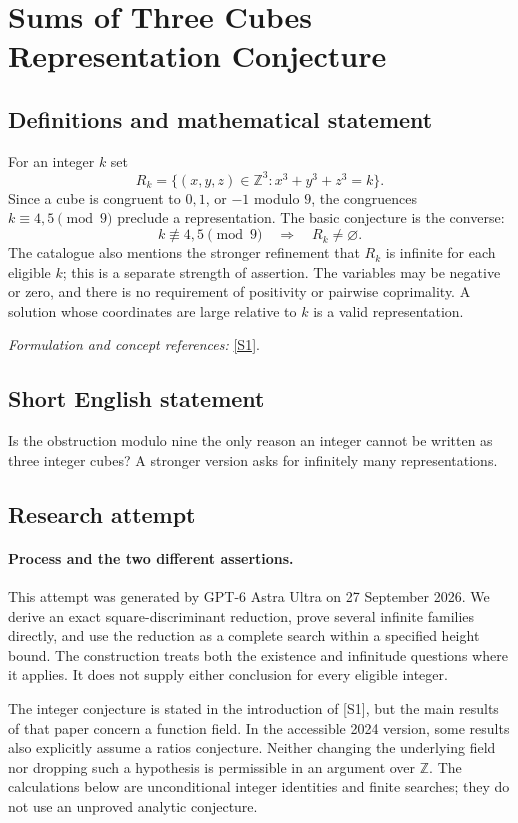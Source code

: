 \documentclass[11pt]{article}
\begin{document}
\section*{\texorpdfstring{Sums of Three Cubes Representation Conjecture}{Sums of Three Cubes Representation Conjecture}}\label{430}
\subsection{Definitions and mathematical statement}
For an integer $k$ set
\[
 R_k=\{(x,y,z)\in{\mathbb{Z}}^3:x^3+y^3+z^3=k\}.
\]
Since a cube is congruent to $0,1$, or $-1$ modulo $9$, the congruences $k\equiv4,5\pmod9$ preclude a representation. The basic conjecture is the converse:
\[
 k\not\equiv4,5\pmod9\quad\Longrightarrow\quad R_k\ne\varnothing.
\]
The catalogue also mentions the stronger refinement that $R_k$ is infinite for each eligible $k$; this is a separate strength of assertion. The variables may be negative or zero, and there is no requirement of positivity or pairwise coprimality. A solution whose coordinates are large relative to $k$ is a valid representation.
\par\smallskip\textit{Formulation and concept references:} \href{https://arxiv.org/pdf/2402.07146}{[S1]}.

\subsection{Short English statement}
Is the obstruction modulo nine the only reason an integer cannot be written as three integer cubes? A stronger version asks for infinitely many representations.
\subsection{Research attempt}
\paragraph{Process and the two different assertions.}
This attempt was generated by GPT-6 Astra Ultra on 27 September 2026. We derive an exact square-discriminant reduction, prove several infinite families directly, and use the reduction as a complete search within a specified height bound. The construction treats both the existence and infinitude questions where it applies. It does not supply either conclusion for every eligible integer.

The integer conjecture is stated in the introduction of [S1], but the main results of that paper concern a function field. In the accessible 2024 version, some results also explicitly assume a ratios conjecture. Neither changing the underlying field nor dropping such a hypothesis is permissible in an argument over $\mathbb Z$. The calculations below are unconditional integer identities and finite searches; they do not use an unproved analytic conjecture.
\end{document}
